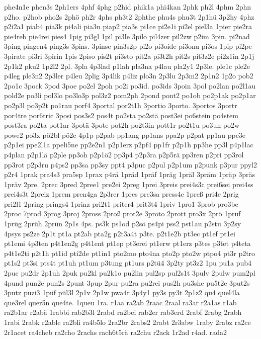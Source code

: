 {phe4n1e
phen3s
2ph1ers
4phf
4phg
p2hid
phik1a
phi4kan
2phk
ph2l
4phm
2phn
p2ho.
p2hob
pho2s
2phö
ph2r
4phs
ph3t2
2phthe
phu4s
phu3t
2p1hü
3p2hy
4phz
p2i2a1
piab4
pia3k
pi4ali
pia3n
piap2
pia3s
pi1ce
pi2e1i
pi2el
piel3a
1pier
pie2ra
pie4reb
pie4rei
pies4
1pig
pi3gl
1pil
pi3le
3pilo
pil4zer
pil2zw
p2im
3pin.
pi2nad
3ping
pingen4
ping3s
3pins.
3pinse
pin3s2p
pi2o
pi3oide
pi3onu
pi3os
1pip
pi2pe
3pirate
pi3ri
3pirin
1pis
2piso
pis2t
pi3sto
pit2a
pi3t2h
pit2s
pit3z2e
pi2z1in
2p1j
2p1k2
pku2
1p2l2
2pl.
3pla
4p3lad
p1lah
pla3na
p4lau
pla2y1
2p3le.
ple1c
ple2e
p4leg
ple3n2
2p3ler
p4leu
2plig
3p4lik
p4liz
plo3n
2p3lu
2p3m2
2p1n2
1p2o
pob2
2po1c
3pock
3pod
3poe
po2el
2poh
po2i
po3id.
po3ids
3poin
3pol
po2lan
po2l1au
pold2e
po3li
pol3lo
po3lo3p
pol3z2
pom2ph
2pond
pont2
po1ob
po2p1ak
po2p1ar
po2p3l
po3p2t
po1rau
porf4
3portal
por2t1h
3portio
3porto.
3portos
3portr
por4tre
por6tric
3posi
pos3s2
pos4t
po2sta
po2stä
post3ei
po6stein
po4stem
post3ra
po2ta
pot1ar
3potä
3pote
pot2h
po2t3in
pott1r
po2t1u
po3un
po2w
powe2
po3x
pö2bl
pö2c
4p1p
p2pab
pp1ang
pp1ans
ppa2p
p2pat
pp1au
ppe3e
p2p1ei
ppe2l1a
ppeli5ne
pp2e2n1
p2p1erz
p2pf4
pp1fr
p2p1h
pp3he
pp3l
p4p1lac
p4plan
p2p1lä
p2ple
pp3oh
p2p1ö2
pp3p4
p2p3ra
p2p5rä
pp3ren
p2pri
pp3rol
pp3rot
p2p3ru
p4ps2
pp3sa
pp3sy
ppt4
p3puc
p2pul
p2p1um
p2punk
p3pur
ppyl2
p2r4
1prak
pra4s3
pra5sp
1prax
p4rä
1präd
1präf
1präg
1präl
3präm
1präp
3präs
1präv
2pre.
2prec
3pred
2pree1
pre2ei
2preg
1prei
3preis
prei4s3c
prei6sei
prei4ss
prei4s3t
2preiz
1prem
pren4ga
2p3rer
1pres
pre3sa
press4e
1preß
pri4e
2prig
pri2l1
2pring
prings4
1prinz
pri2t1
priter4
prit3t4
1priv
1pro1
3prob
pro3be
2proc
7prod
3prog
3proj
2pross
2proß
prot2e
3proto
2prott
pro3x
2prö
1prüf
1prüg
2prüh
2prün
2p1s
4ps.
ps3k
ps1od
p2sö
ps4pi
pss2
pst1au
p2stu
3p2sy
4psys
ps2ze
2p1t
pt1a
pt2ab
pta2g
p2t3a4t
p3te.
p2t1e2b
pt3ec
pt1ef
pt1ei
pt1emi
4p3ten
p4t1en2g
p4t1ent
pt1ep
pt3erei
pt1erw
pt1erz
p3tes
p3tet
p4teta
p4t1e2ti
p2t1h
pt1id
pti2de
pt1in1
pto2mo
pto4na
pto2p
pto2w
ptpo4
pt3r
p2tro
pt1s2
pt3si
pts4t
pt1uh
pt1um
p3tung
pt1urs
p2tü4
3p2ty
pt3z2
1pu
pu1a
pub4
2puc
pu2dr
2p1uh
2puk
pu2kl
pu2k1o
pu2lin
pul2sp
pul2s1t
3pulv
2pulw
pum2pl
4pund
pun2e
pun2s
2punt
3pup
2pur
pu2ra
pu2rei
pus2h
pu3she
pu5t2e
3put2s
3putz
puzi3
1püf
pül3l
2p1v
2p1w
pwa4r
3p4y1
py3s
py3t
2p1z2
qu4
quel4la
que3rel
quer5n
que4te.
1queu
1ra.
r1aa
ra2ab
2raac
2raal
ra3ar
r2a1as
r1ab
ra2b1ar
r2abä
1rabbi
rab2b3l
2rabd
ra2bei
rab2er
rab3erd
2rabf
2rabg
2rabh
1rabi
2rabk
r2able
ra2bli
ra4b5lo
2ra2br
2rabs2
2rabt
2r3abw
1raby
2rabz
ra2ce
2r1acet
ra4cheb
ra2cho
2rachs
rach6t5rä
ra2chu
r2ack
1r2ad
r4ad.
rada2
}
